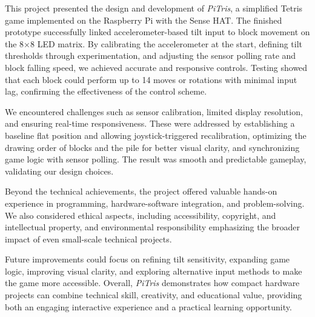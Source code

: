 \documentclass[12pt]{report}
\begin{document}
This project presented the design and development of \textit{PiTris}, a simplified Tetris game implemented on the Raspberry Pi with the Sense HAT. The finished prototype successfully linked accelerometer-based tilt input to block movement on the 8×8 LED matrix. By calibrating the accelerometer at the start, defining tilt thresholds through experimentation, and adjusting the sensor polling rate and block falling speed, we achieved accurate and responsive controls. Testing showed that each block could perform up to 14 moves or rotations with minimal input lag, confirming the effectiveness of the control scheme.

We encountered challenges such as sensor calibration, limited display resolution, and ensuring real-time responsiveness. These were addressed by establishing a baseline flat position and allowing joystick-triggered recalibration, optimizing the drawing order of blocks and the pile for better visual clarity, and synchronizing game logic with sensor polling. The result was smooth and predictable gameplay, validating our design choices.

Beyond the technical achievements, the project offered valuable hands-on experience in programming, hardware-software integration, and problem-solving. We also considered ethical aspects, including accessibility, copyright, and intellectual property, and environmental responsibility emphasizing the broader impact of even small-scale technical projects.

Future improvements could focus on refining tilt sensitivity, expanding game logic, improving visual clarity, and exploring alternative input methods to make the game more accessible. Overall, \textit{PiTris} demonstrates how compact hardware projects can combine technical skill, creativity, and educational value, providing both an engaging interactive experience and a practical learning opportunity.








\end{document}

